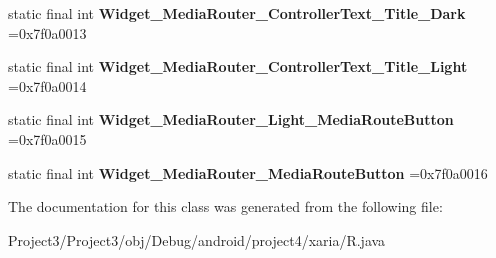 \begin{DoxyCompactItemize}
\item 
\mbox{\label{classproject4_1_1xaria_1_1R_1_1style_a8a673c358576be6220a6846d1a58bdb9}} 
static final int {\bfseries Widget\+\_\+\+Media\+Router\+\_\+\+Controller\+Text\+\_\+\+Title\+\_\+\+Dark} =0x7f0a0013
\item 
\mbox{\label{classproject4_1_1xaria_1_1R_1_1style_af1428697c0fccc4a3bb5209572653457}} 
static final int {\bfseries Widget\+\_\+\+Media\+Router\+\_\+\+Controller\+Text\+\_\+\+Title\+\_\+\+Light} =0x7f0a0014
\item 
\mbox{\label{classproject4_1_1xaria_1_1R_1_1style_a2f6a76defaedc3a77098d9d88466d8b0}} 
static final int {\bfseries Widget\+\_\+\+Media\+Router\+\_\+\+Light\+\_\+\+Media\+Route\+Button} =0x7f0a0015
\item 
\mbox{\label{classproject4_1_1xaria_1_1R_1_1style_a305e3450f0d4132521103130b5722280}} 
static final int {\bfseries Widget\+\_\+\+Media\+Router\+\_\+\+Media\+Route\+Button} =0x7f0a0016
\end{DoxyCompactItemize}


The documentation for this class was generated from the following file\+:\begin{DoxyCompactItemize}
\item 
Project3/\+Project3/obj/\+Debug/android/project4/xaria/R.\+java\end{DoxyCompactItemize}
